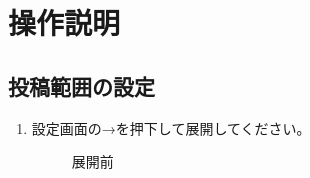 \section{操作説明}
    \subsection{投稿範囲の設定}
    \begin{enumerate}
        \item 設定画面の→を押下して展開してください。
            \begin{figure}[htbp]
                \begin{minipage}[b]{0.45\linewidth}
                    \centering
                    \caption{展開前}
                    \label{img:guide1}
                \end{minipage}
                \begin{minipage}[b]{0.45\linewidth}
                    \centering
\end{minipage}
\end{figure}
\end{enumerate}
